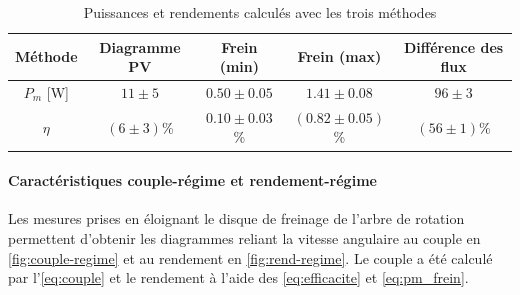 \begin{table}[h]
    \centering
    \begin{tabulary}{\linewidth}{C C C C C}
        \toprule
        Méthode & Diagramme PV & Frein (min) & Frein (max) & Différence des flux \\
        \midrule
        \(P_m\) [\si{\watt}] & \(11 \pm 5\) & \(0.50 \pm 0.05\) & \(1.41 \pm 0.08\) & \(96 \pm 3\) \\
        \(\eta\) & \((6 \pm 3)\)\% & \(0.10 \pm 0.03\)\% & \((0.82 \pm 0.05)\)\% & \((56 \pm 1)\)\% \\
        \bottomrule
    \end{tabulary}
    \caption{Puissances et rendements calculés avec les trois méthodes}
    \label{tab:pm_efficacite}
\end{table}

\paragraph*{Caractéristiques couple-régime et rendement-régime}
Les mesures prises en éloignant le disque de freinage de l'arbre de rotation permettent d'obtenir les diagrammes reliant la vitesse angulaire au couple en \autoref{fig:couple-regime} et au rendement en \autoref{fig:rend-regime}. Le couple a été calculé par l'\autoref{eq:couple} et le rendement à l'aide des \autoref{eq:efficacite} et \autoref{eq:pm_frein}.

